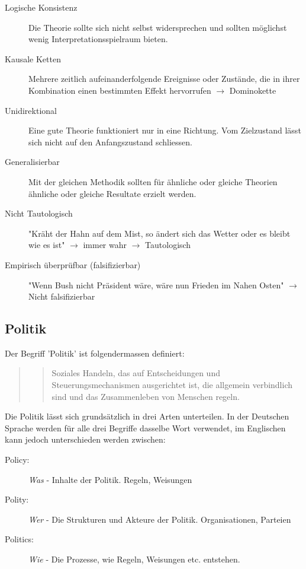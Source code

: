 \documentclass[a4paper, 11pt]{article}
\begin{document}
\begin{description}
	\item [Logische Konsistenz] Die Theorie sollte sich nicht selbst widersprechen und sollten möglichst wenig Interpretationsspielraum bieten.
	\item [Kausale Ketten] Mehrere zeitlich aufeinanderfolgende Ereignisse oder Zustände, die in ihrer Kombination einen bestimmten Effekt hervorrufen $\rightarrow$  Dominokette
	\item [Unidirektional] Eine gute Theorie funktioniert nur in eine Richtung. Vom Zielzustand lässt sich nicht auf den Anfangszustand schliessen.
	\item [Generalisierbar] Mit der gleichen Methodik sollten für ähnliche oder gleiche Theorien ähnliche oder gleiche Resultate erzielt werden.
	\item [Nicht Tautologisch] "Kräht der Hahn auf dem Mist, so ändert sich das Wetter oder es bleibt wie es ist" $\rightarrow$ immer wahr $\rightarrow$ Tautologisch
	\item [Empirisch überprüfbar (falsifizierbar)] "Wenn Bush nicht Präsident wäre, wäre nun Frieden im Nahen Osten" $\rightarrow$  Nicht falsifizierbar
\end{description}

\subsection{Politik}
Der Begriff 'Politik' ist folgendermassen definiert:

\begin{quote}
    \blockquote{Soziales Handeln, das auf Entscheidungen und Steuerungsmechanismen ausgerichtet ist, die allgemein verbindlich sind und das Zusammenleben von Menschen regeln.}
\end{quote}

Die Politik lässt sich grundsätzlich in drei Arten unterteilen. In der Deutschen Sprache werden für alle drei Begriffe dasselbe Wort verwendet, im Englischen kann jedoch unterschieden werden zwischen: 
\begin{description}
    \item[Policy: ] \textit{Was} - Inhalte der Politik. Regeln, Weisungen
    \item[Polity:] \textit{Wer} - Die Strukturen und Akteure der Politik.  Organisationen, Parteien 
    \item[Politics:]  \textit{Wie} - Die Prozesse, wie Regeln, Weisungen etc. entstehen.
\end{description}
\end{document}
